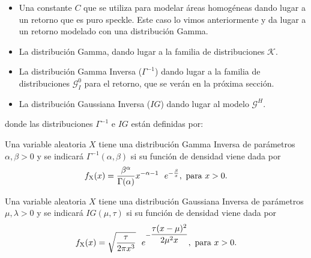 \begin{itemize}
	\item Una constante $C$ que se utiliza para modelar áreas homogéneas dando lugar a un retorno que es puro speckle. Este caso lo vimos anteriormente y da lugar a un retorno modelado con una distribución Gamma.
	\item La distribución Gamma, dando lugar a la familia de distribuciones $\mathcal{K}$. 
	\item La distribución Gamma Inversa ($\Gamma^{-1}$) dando lugar a la familia de distribuciones $\mathcal{G}_I^0$ para el retorno, que se verán en la próxima sección.
	\item La distribución Gaussiana Inversa ($IG$) dando lugar al modelo $\mathcal{G}^H$.
\end{itemize}

donde las distribuciones $\Gamma^{-1}$ e  $IG$ están definidas por:

\begin{definition}
	\label{InversaGamma}
	Una variable aleatoria $X$ tiene una distribución Gamma Inversa  de parámetros $\alpha, \beta >0$  y se indicará $\Gamma^{-1}(\alpha,\beta)$ si su función de densidad viene dada por
	\begin{align}
	f_{\text X}(x)=\dfrac{\beta^{\alpha}}{\Gamma(\alpha)} x^{-\alpha-1} \ \ e^{- \frac{\beta}{x}}, \text{ para } x>0.
	\end{align}
\end{definition}

\begin{definition}
	\label{InversaGaussiana}
	Una variable aleatoria $X$ tiene una distribución Gaussiana Inversa de parámetros $\mu, \lambda >0$  y se indicará $IG(\mu,\tau)$ si su función de densidad viene dada por
	\begin{align}
	\label{IG}
	f_{\text X}(x)=\sqrt{\dfrac{\tau}{2 \pi x^3}} \ \ e^{- \dfrac{\tau (x-\mu)^2}{2 \mu^2 x}}, \text{ para } x>0.
	\end{align}
\end{definition}

